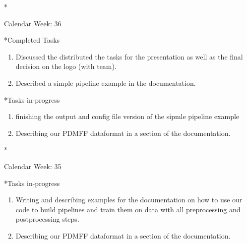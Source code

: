 \documentclass[11pt,a4paper]{article}
\begin{document}
\newpage
\begin{section}*{Calendar Week: 36 \hfill \date{10 September, 2021}}
	
	\begin{subsection}*{Completed Tasks}
		\begin{enumerate}
			\item Discussed the distributed the tasks for the presentation as well as the final decision on the logo (with team).
			\item Described a simple pipeline example in the documentation.
		\end{enumerate}
	\end{subsection}
	
	\begin{subsection}*{Tasks in-progress}
		\begin{enumerate}
			\item finishing the output and config file version of the sipmle pipeline example
			\item Describing our PDMFF dataformat in a section of the documentation.
		\end{enumerate}
	\end{subsection}
	
\end{section}

\newpage
\begin{section}*{Calendar Week: 35 \hfill \date{03 September, 2021}}
	
	\begin{subsection}*{Tasks in-progress}
		\begin{enumerate}
			\item Writing and describing examples for the documentation on how to use our code to build pipelines and train them on data with all preprocessing and postprocessing steps.
			\item Describing our PDMFF dataformat in a section of the documentation.
		\end{enumerate}
	\end{subsection}
	
\end{section}
\end{document}
